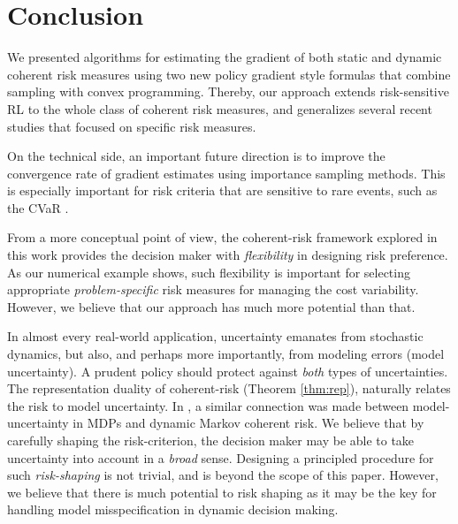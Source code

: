 \documentclass{article} %
\begin{document}

\vspace{-0.05in}
\section{Conclusion}
\vspace{-0.05in}

We presented algorithms for estimating the gradient of both static and dynamic coherent risk measures using two new policy gradient style formulas that combine sampling with convex programming. Thereby, our approach extends risk-sensitive RL to the whole class of coherent risk measures, and generalizes several recent studies that focused on specific risk measures.

On the technical side, an important future direction is to improve the convergence rate of gradient estimates using importance sampling methods. This is especially important for risk criteria that are sensitive to rare events, such as the CVaR \cite{bardou2009computing}.

From a more conceptual point of view, the coherent-risk framework explored in this work provides the decision maker  with
\emph{flexibility} in designing risk preference. As our numerical example shows, such flexibility is important for selecting appropriate \emph{problem-specific} risk measures for managing the cost variability. However, we believe that our approach has much more potential than that.

In almost every real-world application, uncertainty emanates from  stochastic dynamics, but also, and perhaps more importantly, from modeling errors (model uncertainty). A prudent policy should protect against \emph{both} types of uncertainties. The representation duality of coherent-risk (Theorem \ref{thm:rep}), naturally relates the risk to model uncertainty. In \cite{osogami2012robustness}, a similar connection was made between model-uncertainty in MDPs and dynamic Markov coherent risk. We believe that by carefully shaping the risk-criterion, the decision maker may be able to take uncertainty into account in a  \emph{broad} sense.
Designing a principled procedure for such \emph{risk-shaping} is not trivial, and is beyond the scope of this paper. However, we believe that there is much potential to risk shaping as it may be the key for handling model misspecification in dynamic decision making.
\end{document}
